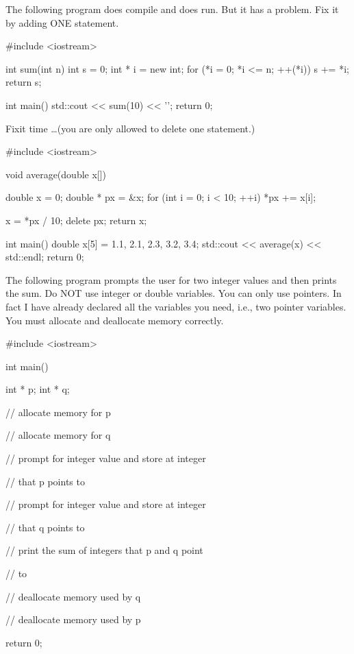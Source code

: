 \begin{ex}
The following program does compile and does run. But it has a problem. Fix it by adding ONE statement.

\begin{consolethree}[escapeinside=||]
#include <iostream>

int sum(int n)
{
    int s = 0;
    int * i = new int;
    for (*i = 0; *i <= n; ++(*i))
    {
        s += *i;
    }
    return s;
}

int main()
{   
    std::cout << sum(10) << '\n';
    return 0;
}
\end{consolethree}
\end{ex}
\begin{ex}
Fixit time \ldots (you are only allowed to delete one statement.)

\begin{consolethree}[escapeinside=||]
#include <iostream>

void average(double x[])
{
    double x = 0;
    double * px = &x;
    for (int i = 0; i < 10; ++i)
    {
        *px += x[i];
    }

    x = *px / 10;
    delete px;
    return x;
}

int main()
{
    double x[5] = {1.1, 2.1, 2.3, 3.2, 3.4};
    std::cout << average(x) << std::endl;
    return 0;
}
\end{consolethree}
\end{ex}
\begin{ex}
The following program prompts the user for two integer values and then prints the sum. Do NOT use integer or double variables. You can only use pointers. In fact I have already declared all the variables you need, i.e., two pointer variables. You must allocate and deallocate memory correctly.

\begin{consolethree}[escapeinside=||]
#include <iostream>

int main()
{
    int * p;
    int * q;

    // allocate memory for p

    // allocate memory for q

    // prompt for integer value and store at integer

    // that p points to

    // prompt for integer value and store at integer

    // that q points to

    // print the sum of integers that p and q point

    // to
    
    // deallocate memory used by q

    // deallocate memory used by p

   return 0;
}
\end{consolethree}
\end{ex}

